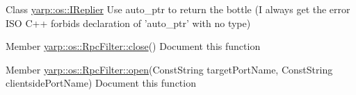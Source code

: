 \label{todo__todo000007}
\hypertarget{todo__todo000007}{}
 
\begin{DoxyDescription}
\item[Class \hyperlink{classyarp_1_1os_1_1_i_replier}{yarp::os::IReplier} ]Use auto\_\-ptr to return the bottle (I always get the error ISO C++ forbids declaration of 'auto\_\-ptr' with no type) 
\end{DoxyDescription}

\label{todo__todo000009}
\hypertarget{todo__todo000009}{}
 
\begin{DoxyDescription}
\item[Member \hyperlink{classyarp_1_1os_1_1_rpc_filter_a7c3fd3737767ad8ae8730e44e96d1f20}{yarp::os::RpcFilter::close}() ]Document this function 
\end{DoxyDescription}

\label{todo__todo000008}
\hypertarget{todo__todo000008}{}
 
\begin{DoxyDescription}
\item[Member \hyperlink{classyarp_1_1os_1_1_rpc_filter_adeb2b65f313a9ef7986244d81fdab354}{yarp::os::RpcFilter::open}(ConstString targetPortName, ConstString clientsidePortName) ]Document this function 
\end{DoxyDescription}